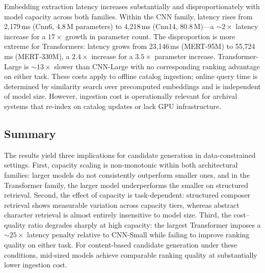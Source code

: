 \documentclass[sigconf]{acmart}
\begin{document}
\begin{table}[!htbp]
\centering
\caption{Embedding extraction cost, model size, and embedding dimensionality across model capacities. Parameter counts for CNN-based models are obtained from \cite{kong2020panns}, while Transformer parameter counts are based on publicly available pretrained checkpoints.}
\label{tab:latency_results}
\end{table}

Embedding extraction latency increases substantially and disproportionately with model capacity across both families. Within the CNN family, latency rises from 2{,}179\,ms (Cnn6, 4.8\,M parameters) to 4{,}218\,ms (Cnn14, 80.8\,M)---a ${\sim}2{\times}$ latency increase for a $17{\times}$ growth in parameter count. The disproportion is more extreme for Transformers: latency grows from 23{,}146\,ms (MERT-95M) to 55{,}724\,ms (MERT-330M), a $2.4{\times}$ increase for a $3.5{\times}$ parameter increase. Transformer-Large is ${\sim}13{\times}$ slower than CNN-Large with no corresponding ranking advantage on either task. These costs apply to offline catalog ingestion; online query time is determined by similarity search over precomputed embeddings and is independent of model size. However, ingestion cost is operationally relevant for archival systems that re-index on catalog updates or lack GPU infrastructure.

\subsection{Summary}

The results yield three implications for candidate generation in data-constrained settings. First, capacity scaling is non-monotonic within both architectural families: larger models do not consistently outperform smaller ones, and in the Transformer family, the larger model underperforms the smaller on structured retrieval. Second, the effect of capacity is task-dependent: structured composer retrieval shows measurable variation across capacity tiers, whereas abstract character retrieval is almost entirely insensitive to model size. Third, the cost--quality ratio degrades sharply at high capacity: the largest Transformer imposes a ${\sim}25{\times}$ latency penalty relative to CNN-Small while failing to improve ranking quality on either task. For content-based candidate generation under these conditions, mid-sized models achieve comparable ranking quality at substantially lower ingestion cost.
\end{document}
